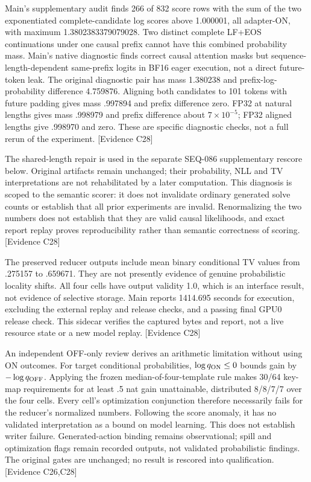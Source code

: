 \documentclass[11pt]{article}
\newcommand{\ev}[1]{\textsf{[Evidence #1]}}
\begin{document}
Main's supplementary audit finds 266 of 832 score rows with the sum of the two
exponentiated complete-candidate log scores above 1.000001, all adapter-ON,
with maximum 1.3802383379079028. Two distinct complete LF+EOS continuations
under one causal prefix cannot have this combined probability mass. Main's
native diagnostic finds correct causal attention masks but sequence-length-dependent
same-prefix logits in BF16 eager execution, not a direct future-token leak.
The original diagnostic pair has mass 1.380238 and prefix-log-probability
difference 4.759876. Aligning both candidates to 101 tokens with future padding
gives mass .997894 and prefix difference zero. FP32 at natural lengths gives
mass .998979 and prefix difference about $7\times10^{-5}$; FP32 aligned lengths
give .998970 and zero. These are specific diagnostic checks, not a full rerun
of the experiment. \ev{C28}

The shared-length repair is used in the separate SEQ-086 supplementary rescore
below. Original artifacts remain unchanged; their probability, NLL and TV
interpretations are not rehabilitated by a later computation. This diagnosis is scoped to the semantic
scorer: it does not invalidate ordinary generated solve counts or establish
that all prior experiments are invalid. Renormalizing the two numbers does not establish that they are valid
causal likelihoods, and exact report replay proves reproducibility rather than
semantic correctness of scoring. \ev{C28}

The preserved reducer outputs include mean binary conditional TV values from
.275157 to .659671. They are not presently evidence of genuine probabilistic
locality shifts. All four
cells have output validity 1.0, which is an interface result, not evidence of
selective storage. Main reports 1414.695 seconds for execution, excluding the
external replay and release checks, and a passing final GPU0 release check.
This sidecar verifies the captured bytes and report, not a live resource state
or a new model replay. \ev{C28}

An independent
OFF-only review derives an arithmetic limitation without using ON outcomes.
For target conditional probabilities, $\log q_{\rm ON}\leq0$ bounds gain by
$-\log q_{\rm OFF}$. Applying the frozen median-of-four-template rule makes
30/64 key-map requirements for at least .5 nat gain unattainable, distributed
8/8/7/7 over the four cells. Every cell's optimization conjunction therefore
necessarily fails for the reducer's normalized numbers. Following the score
anomaly, it has no validated interpretation as a bound on model learning. This does
not establish writer failure. Generated-action binding remains observational;
spill and optimization flags remain recorded outputs, not validated probabilistic
findings. The original
gates are unchanged; no result is rescored into qualification. \ev{C26,C28}
\end{document}
